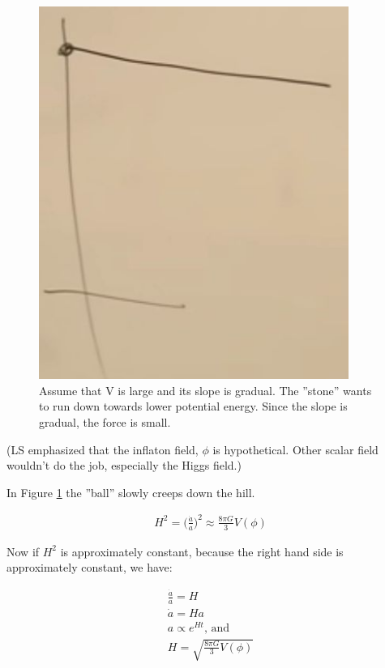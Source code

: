 \documentclass[]{article}
\begin{document}
\begin{figure}[H]
	\caption[V is large and its slope is gradual]{Assume that V is large and its slope is gradual. The ''stone'' wants to run down towards lower potential energy. Since the slope is gradual, the force is small.}\label{fig:cosmo-9-potential}
	\includegraphics[width=0.9\textwidth]{cosmo-9-potential}
\end{figure}

(LS emphasized that the inflaton field, $\phi$ is hypothetical. Other scalar field wouldn't do the job, especially the Higgs field.)

In Figure \ref{fig:cosmo-9-potential} the ''ball'' slowly creeps down the hill.

\begin{align*}
	H^2 = \big(\frac{\dot{a}}{a}\big)^2 \approx \frac{8\pi G}{3} V(\phi)
\end{align*}

Now if $H^2$ is approximately constant, because the right hand side is approximately constant, we have:

\begin{align*}
	\frac{\dot{a}}{a} = H\\
	\dot{a} = Ha\\
	a\propto e^{Ht} \text{, and}\\
	H = \sqrt{\frac{8\pi G}{3} V(\phi)}
\end{align*}
\end{document}

